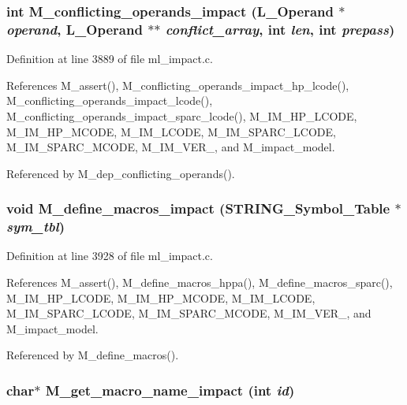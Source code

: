 \subsubsection{\setlength{\rightskip}{0pt plus 5cm}int M\_\-conflicting\_\-operands\_\-impact (L\_\-Operand $\ast$ {\em operand}, L\_\-Operand $\ast$$\ast$ {\em conflict\_\-array}, int {\em len}, int {\em prepass})}\label{m__impact_8h_e740f1408e76772a425f3deb201be249}




Definition at line 3889 of file ml\_\-impact.c.

References M\_\-assert(), M\_\-conflicting\_\-operands\_\-impact\_\-hp\_\-lcode(), M\_\-conflicting\_\-operands\_\-impact\_\-lcode(), M\_\-conflicting\_\-operands\_\-impact\_\-sparc\_\-lcode(), M\_\-IM\_\-HP\_\-LCODE, M\_\-IM\_\-HP\_\-MCODE, M\_\-IM\_\-LCODE, M\_\-IM\_\-SPARC\_\-LCODE, M\_\-IM\_\-SPARC\_\-MCODE, M\_\-IM\_\-VER\_, and M\_\-impact\_\-model.

Referenced by M\_\-dep\_\-conflicting\_\-operands().
\subsubsection{\setlength{\rightskip}{0pt plus 5cm}void M\_\-define\_\-macros\_\-impact (\bf{STRING\_\-Symbol\_\-Table} $\ast$ {\em sym\_\-tbl})}\label{m__impact_8h_0e3e1a774dd4511d032a382c6d873d70}




Definition at line 3928 of file ml\_\-impact.c.

References M\_\-assert(), M\_\-define\_\-macros\_\-hppa(), M\_\-define\_\-macros\_\-sparc(), M\_\-IM\_\-HP\_\-LCODE, M\_\-IM\_\-HP\_\-MCODE, M\_\-IM\_\-LCODE, M\_\-IM\_\-SPARC\_\-LCODE, M\_\-IM\_\-SPARC\_\-MCODE, M\_\-IM\_\-VER\_, and M\_\-impact\_\-model.

Referenced by M\_\-define\_\-macros().
\subsubsection{\setlength{\rightskip}{0pt plus 5cm}char$\ast$ M\_\-get\_\-macro\_\-name\_\-impact (int {\em id})}\label{m__impact_8h_445e0d3936d21b3a448d064579eab029}




